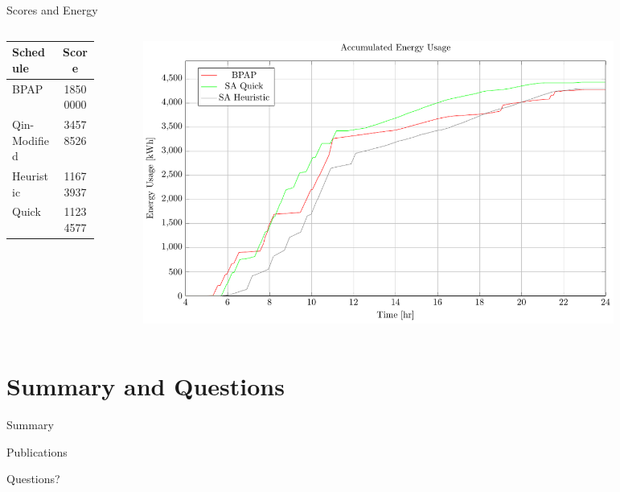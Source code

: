 \documentclass[aspectratio=169,dvipsnames]{beamer}
\begin{document}
\begin{frame}[label={sec:org406f1d2}]{Scores and Energy}
\begin{columns}
\begin{column}{0.35\columnwidth}
\begin{center}
\begin{tabular}{l|c}
\hline
Schedule & Score\\[0pt]
\hline
BPAP & \num{18500000}\\[0pt]
Qin-Modified & \num{34578526}\\[0pt]
Heuristic & \num{11673937}\\[0pt]
Quick & \num{11234577}\\[0pt]
\hline
\end{tabular}
\end{center}
\end{column}

\begin{column}{0.75\columnwidth}
\begin{figure}[htpb]
\centering
    \includegraphics[width=0.9\textwidth]{img/sa-pap-paper-good/energy-zoom}
\end{figure}
\end{column}
\end{columns}
\end{frame}

\section{Summary and Questions}
\label{sec:org4e1cc7b}
\begin{frame}[label={sec:orgc222d38}]{Summary}
\end{frame}
\begin{frame}[label={sec:org8b846b0}]{Publications}
\end{frame}
\begin{frame}[label={sec:org3331d3f}]{}
\centering
\Huge Questions?
\end{frame}
\end{document}

